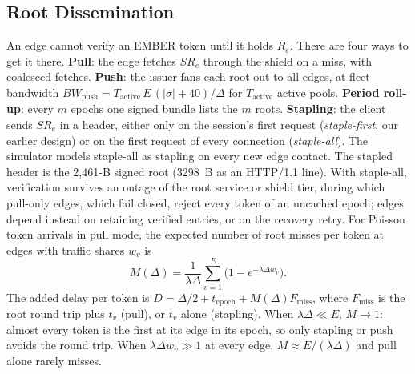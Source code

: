 \subsection{Root Dissemination}
\label{sec:dissem}
An edge cannot verify an EMBER token until it holds $R_e$. There are four ways to get it there. \textbf{Pull}: the edge fetches $SR_e$ through the shield on a miss, with coalesced fetches. \textbf{Push}: the issuer fans each root out to all edges, at fleet bandwidth $BW_{\text{push}}=T_{\text{active}}\,E\,(|\sigma|+40)/\Delta$ for $T_{\text{active}}$ active pools. \textbf{Period roll-up}: every $m$ epochs one signed bundle lists the $m$ roots. \textbf{Stapling}: the client sends $SR_e$ in a header, either only on the session's first request (\emph{staple-first}, our earlier design) or on the first request of every connection (\emph{staple-all}). The simulator models staple-all as stapling on every new edge contact. The stapled header is the 2,461-B signed root (\num{3298}~B as an HTTP/1.1 line). With staple-all, verification survives an outage of the root service or shield tier, during which pull-only edges, which fail closed, reject every token of an uncached epoch; edges depend instead on retaining verified entries, or on the recovery retry. For Poisson token arrivals in pull mode, the expected number of root misses per token at edges with traffic shares $w_v$ is
\begin{equation}
M(\Delta)=\frac{1}{\lambda\Delta}\sum_{v=1}^{E}\bigl(1-e^{-\lambda\Delta w_v}\bigr).
\label{eq:miss}
\end{equation}
The added delay per token is $D=\Delta/2+t_{\text{epoch}}+M(\Delta)F_{\text{miss}}$, where $F_{\text{miss}}$ is the root round trip plus $t_v$ (pull), or $t_v$ alone (stapling). When $\lambda\Delta\ll E$, $M\to1$: almost every token is the first at its edge in its epoch, so only stapling or push avoids the round trip. When $\lambda\Delta w_v\gg1$ at every edge, $M\approx E/(\lambda\Delta)$ and pull alone rarely misses.

